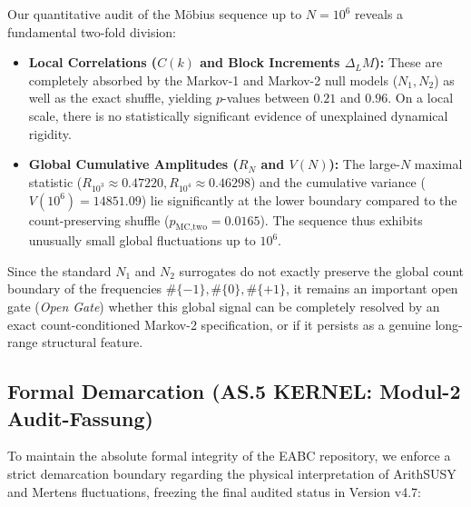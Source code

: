 \documentclass[11pt,a4paper]{article}
\theoremstyle{definition}
\begin{document}
	Our quantitative audit of the Möbius sequence up to $N = 10^6$ reveals a fundamental two-fold division:
	\begin{itemize}
		\item \textbf{Local Correlations ($C(k)$ and Block Increments $\Delta_L M$):} These are completely absorbed by the Markov-1 and Markov-2 null models ($N_1, N_2$) as well as the exact shuffle, yielding $p$-values between $0.21$ and $0.96$. On a local scale, there is no statistically significant evidence of unexplained dynamical rigidity.
		\item \textbf{Global Cumulative Amplitudes ($R_N$ and $V(N)$):} The large-$N$ maximal statistic ($R_{10^3} \approx 0.47220, R_{10^4} \approx 0.46298$) and the cumulative variance ($V(10^6) = 14851.09$) lie significantly at the lower boundary compared to the count-preserving shuffle ($p_{\text{MC,two}} = 0.0165$). The sequence thus exhibits unusually small global fluctuations up to $10^6$.
	\end{itemize}
	Since the standard $N_1$ and $N_2$ surrogates do not exactly preserve the global count boundary of the frequencies $\#\{-1\}, \#\{0\}, \#\{+1\}$, it remains an important open gate (\emph{Open Gate}) whether this global signal can be completely resolved by an exact count-conditioned Markov-2 specification, or if it persists as a genuine long-range structural feature.
	
	\subsection{Formal Demarcation (AS.5 KERNEL: Modul-2 Audit-Fassung)}
	To maintain the absolute formal integrity of the EABC repository, we enforce a strict demarcation boundary regarding the physical interpretation of ArithSUSY and Mertens fluctuations, freezing the final audited status in Version v4.7:
	
\end{document}
